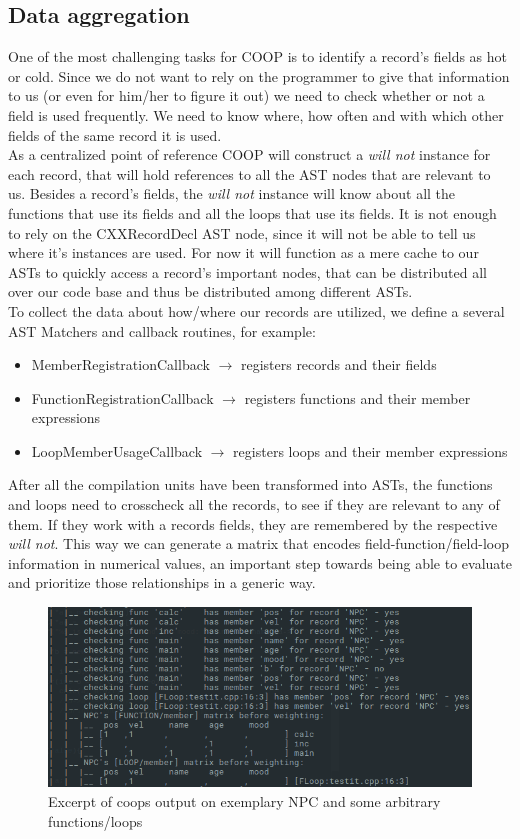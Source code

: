 \subsection{Data aggregation}\label{data_aggregation}
One of the most challenging tasks for COOP is to identify a record's fields as hot or cold. Since we do not want to rely on the programmer to give that information to us (or even for him/her to figure it out) we need to check whether or not a field is used frequently. We need to know where, how often and with which other fields of the same record it is used.\\
As a centralized point of reference COOP will construct a \textit{will not} instance for each record, that will hold references to all the AST nodes that are relevant to us. Besides a record's fields, the \textit{will not} instance will know about all the functions that use its fields and all the loops that use its fields. It is not enough to rely on the CXXRecordDecl AST node, since it will not be able to tell us where it's instances are used. For now it will function as a mere cache to our ASTs to quickly access a record's important nodes, that can be distributed all over our code base and thus be distributed among different ASTs.\\
To collect the data about how/where our records are utilized, we define a several AST Matchers and callback routines, for example:
\begin{itemize}
	\item MemberRegistrationCallback $\rightarrow$ registers records and their fields
	\item FunctionRegistrationCallback $\rightarrow$ registers functions and their member expressions
	\item LoopMemberUsageCallback $\rightarrow$ registers loops and their member expressions
\end{itemize}
After all the compilation units have been transformed into ASTs, the functions and loops need to crosscheck all the records, to see if they are relevant to any of them. If they work with a records fields, they are remembered by the respective \textit{will not}. This way we can generate a matrix that encodes field-function/field-loop information in numerical values, an important step towards being able to evaluate and prioritize those relationships in a generic way.
\begin{figure}[!htbp]
	\centering
	\includegraphics[width=.7\linewidth, height=0.3\linewidth]{PICs/npc_crosscheck_matrix}
	\caption{Excerpt of coops output on exemplary NPC and some arbitrary functions/loops}\label{npc_crosscheck_matrix}
\end{figure}
